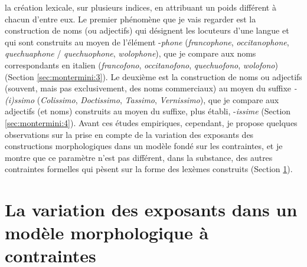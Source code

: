 \documentclass[output=paper]{langsci/langscibook}
\begin{document}
la création lexicale, sur plusieurs indices, en attribuant un poids
différent à chacun d'entre eux. Le premier phénomène que je vais
regarder est la construction de noms (ou adjectifs) qui désignent les
locuteurs d'une langue et qui sont construits au moyen de l'élément
-\emph{phone} (\emph{francophone}, \emph{occitanophone},
\emph{quechuaphone} / \emph{quechuophone}, \emph{wolophone}), que je
compare aux noms correspondants en italien (\emph{francofono},
\emph{occitanofono}, \emph{quechuofono}, \emph{wolofono}) (Section \ref{sec:montermini:3}). Le
deuxième est la construction de noms ou adjectifs (souvent, mais pas
exclusivement, des noms commerciaux) au moyen du suffixe
\emph{-(i)ssimo} (\emph{Colissimo}, \emph{Doctissimo}, \emph{Tassimo},
\emph{Vernissimo}), que je compare aux adjectifs (et noms) construits au
moyen du suffixe, plus établi, -\emph{issime} (Section \ref{sec:montermini:4}). Avant ces études
empiriques, cependant, je propose quelques observations sur la prise en
compte de la variation des exposants des constructions morphologiques
dans un modèle fondé sur les contraintes, et je montre que ce paramètre
n'est pas différent, dans la substance, des autres contraintes formelles
qui pèsent sur la forme des lexèmes construits (Section \ref{sec:montermini:2}).

\section{La variation des exposants dans un modèle morphologique à
contraintes}\label{sec:montermini:2}
\end{document}
